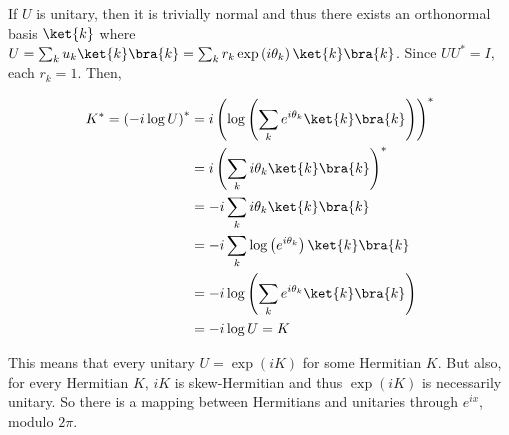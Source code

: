 \par If $U$ is unitary, then it is trivially normal and thus there exists an
orthonormal basis $\ket{k}$ where $U = \sum_k{u_k \ket{k} \bra{k}} = \sum_k{r_k
\exp \left( i \theta_k \right) \ket{k} \bra{k}}$. Since $U U^* = I$, each $r_k =
1$. Then,

\begin{align}
K^* = \left( -i \log U \right)^* &= i \left( \log \left( \sum_k{e^{i \theta_k}
\ket{k} \bra{k}} \right) \right)^* \\
&= i \left( \sum_k{i \theta_k \ket{k} \bra{k}} \right)^* \\
&= -i \sum_k{i \theta_k \ket{k} \bra{k}} \\
&= -i \sum_k{\log \left( e^{i \theta_k} \right) \ket{k} \bra{k}} \\
&= -i \log \left( \sum_k{e^{i \theta_k} \ket{k} \bra{k}} \right) \\
&= -i \log U = K
\end{align}

This means that every unitary $U = \exp \left( i K \right)$ for some Hermitian
$K$. But also, for every Hermitian $K$, $i K$ is skew-Hermitian and thus $\exp
\left( i K \right)$ is necessarily unitary. So there is a mapping between
Hermitians and unitaries through $e^{i x}$, modulo $2 \pi$.
